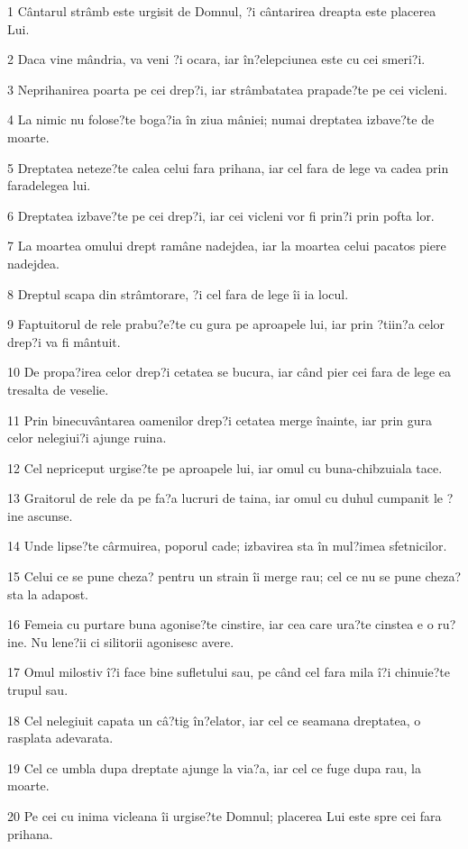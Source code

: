 \par 1 Cântarul strâmb este urgisit de Domnul, ?i cântarirea dreapta este placerea Lui.
\par 2 Daca vine mândria, va veni ?i ocara, iar în?elepciunea este cu cei smeri?i.
\par 3 Neprihanirea poarta pe cei drep?i, iar strâmbatatea prapade?te pe cei vicleni.
\par 4 La nimic nu folose?te boga?ia în ziua mâniei; numai dreptatea izbave?te de moarte.
\par 5 Dreptatea neteze?te calea celui fara prihana, iar cel fara de lege va cadea prin faradelegea lui.
\par 6 Dreptatea izbave?te pe cei drep?i, iar cei vicleni vor fi prin?i prin pofta lor.
\par 7 La moartea omului drept ramâne nadejdea, iar la moartea celui pacatos piere nadejdea.
\par 8 Dreptul scapa din strâmtorare, ?i cel fara de lege îi ia locul.
\par 9 Faptuitorul de rele prabu?e?te cu gura pe aproapele lui, iar prin ?tiin?a celor drep?i va fi mântuit.
\par 10 De propa?irea celor drep?i cetatea se bucura, iar când pier cei fara de lege ea tresalta de veselie.
\par 11 Prin binecuvântarea oamenilor drep?i cetatea merge înainte, iar prin gura celor nelegiui?i ajunge ruina.
\par 12 Cel nepriceput urgise?te pe aproapele lui, iar omul cu buna-chibzuiala tace.
\par 13 Graitorul de rele da pe fa?a lucruri de taina, iar omul cu duhul cumpanit le ?ine ascunse.
\par 14 Unde lipse?te cârmuirea, poporul cade; izbavirea sta în mul?imea sfetnicilor.
\par 15 Celui ce se pune cheza? pentru un strain îi merge rau; cel ce nu se pune cheza? sta la adapost.
\par 16 Femeia cu purtare buna agonise?te cinstire, iar cea care ura?te cinstea e o ru?ine. Nu lene?ii ci silitorii agonisesc avere.
\par 17 Omul milostiv î?i face bine sufletului sau, pe când cel fara mila î?i chinuie?te trupul sau.
\par 18 Cel nelegiuit capata un câ?tig în?elator, iar cel ce seamana dreptatea, o rasplata adevarata.
\par 19 Cel ce umbla dupa dreptate ajunge la via?a, iar cel ce fuge dupa rau, la moarte.
\par 20 Pe cei cu inima vicleana îi urgise?te Domnul; placerea Lui este spre cei fara prihana.
